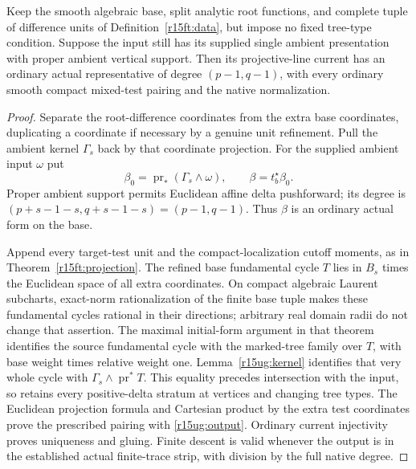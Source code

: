 \begin{theorem}
\label{r15ug:projection}
Keep the smooth algebraic base, split analytic root functions,
and complete tuple of difference units of Definition~\ref{r15ft:data},
but impose no fixed tree-type condition. Suppose the input still
has its supplied single ambient presentation with proper ambient
vertical support. Then its projective-line current has an ordinary
actual representative of degree $(p-1,q-1)$, with every ordinary
smooth compact mixed-test pairing and the native normalization.
\end{theorem}

\begin{proof}
Separate the root-difference coordinates from the extra base
coordinates, duplicating a coordinate if necessary by a genuine
unit refinement. Pull the ambient kernel $\Gamma_s$ back by that
coordinate projection. For the supplied ambient input $\omega$ put
\[
          \beta_0=\operatorname{pr}_*(\Gamma_s\wedge\omega),
                   \qquad\beta=t_b^\star\beta_0.
\tag{UG15.8}\label{r15ug:output}
\]
Proper ambient support permits Euclidean affine delta pushforward;
its degree is $(p+s-1-s,q+s-1-s)=(p-1,q-1)$.
Thus $\beta$ is an ordinary actual form on the base.

Append every target-test unit and the compact-localization cutoff
moments, as in Theorem~\ref{r15ft:projection}. The refined base
fundamental cycle $T$ lies in $B_s$ times the Euclidean space of
all extra coordinates. On compact algebraic Laurent subcharts,
exact-norm rationalization of the finite base tuple makes these
fundamental cycles rational in their directions; arbitrary real
domain radii do not change that assertion. The maximal initial-form argument in that
theorem identifies the source fundamental cycle with the marked-tree
family over $T$, with base weight times relative weight one.
Lemma~\ref{r15ug:kernel} identifies that very whole cycle with
$\Gamma_s\wedge\operatorname{pr}^*T$. This equality precedes
intersection with the input, so retains every positive-delta stratum
at vertices and changing tree types. The Euclidean projection formula
and Cartesian product by the extra test coordinates prove the
prescribed pairing with \eqref{r15ug:output}. Ordinary current
injectivity proves uniqueness and gluing. Finite descent is valid
whenever the output is in the established actual finite-trace strip,
with division by the full native degree.
\end{proof}

